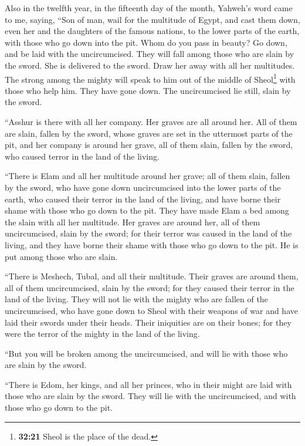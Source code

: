  Also in the twelfth year, in the fifteenth day of the
month, Yahweh's word came to me, saying,  ``Son of man,
wail for the multitude of Egypt, and cast them down, even her and the
daughters of the famous nations, to the lower parts of the earth, with
those who go down into the pit.  Whom do you pass in
beauty? Go down, and be laid with the uncircumcised. 
They will fall among those who are slain by the sword. She is delivered
to the sword. Draw her away with all her multitudes.  The
strong among the mighty will speak to him out of the middle of
Sheol\footnote{\textbf{32:21} Sheol is the place of the dead.} with
those who help him. They have gone down. The uncircumcised lie still,
slain by the sword.

 ``Asshur is there with all her company. Her graves are
all around her. All of them are slain, fallen by the sword,
 whose graves are set in the uttermost parts of the pit,
and her company is around her grave, all of them slain, fallen by the
sword, who caused terror in the land of the living.

 ``There is Elam and all her multitude around her grave;
all of them slain, fallen by the sword, who have gone down uncircumcised
into the lower parts of the earth, who caused their terror in the land
of the living, and have borne their shame with those who go down to the
pit.  They have made Elam a bed among the slain with all
her multitude. Her graves are around her, all of them uncircumcised,
slain by the sword; for their terror was caused in the land of the
living, and they have borne their shame with those who go down to the
pit. He is put among those who are slain.

 ``There is Meshech, Tubal, and all their multitude.
Their graves are around them, all of them uncircumcised, slain by the
sword; for they caused their terror in the land of the living.
 They will not lie with the mighty who are fallen of the
uncircumcised, who have gone down to Sheol with their weapons of war and
have laid their swords under their heads. Their iniquities are on their
bones; for they were the terror of the mighty in the land of the living.

 ``But you will be broken among the uncircumcised, and
will lie with those who are slain by the sword.

 ``There is Edom, her kings, and all her princes, who in
their might are laid with those who are slain by the sword. They will
lie with the uncircumcised, and with those who go down to the pit.

